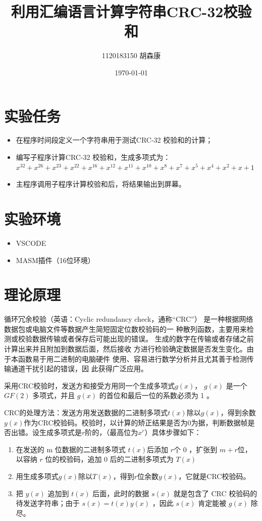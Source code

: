 \documentclass[UTF-8, a4paper, 12pt]{ctexart}
\title{\bfseries \Huge  利用汇编语言计算字符串CRC-32校验和}
\author{1120183150 胡森康}
\date{\today}
\begin{document}



\thispagestyle{empty}
\newpage
\thispagestyle{empty}

\maketitle
\tableofcontents
\newpage

\section{实验任务}
\begin{itemize}
    \item 在程序时间段定义一个字符串用于测试CRC-32 校验和的计算；
    \item 编写子程序计算CRC-32 校验和，生成多项式为：
    $x^{32}+x^{26}+x^{23}+x^{22}+x^{16}+x^{12}+x^{11}+x^{10}+x^{8}+x^{7}+x^{5}+x^{4}+x^{2}+x+1$
    \item 主程序调用子程序计算校验和后，将结果输出到屏幕。
\end{itemize}
\section{实验环境}
    \begin{itemize}
        \item VSCODE
        \item MASM插件（16位环境）
    \end{itemize}
\section{理论原理}
循环冗余校验（英语：Cyclic redundancy check，通称“CRC”）
是一种根据网络数据包或电脑文件等数据产生简短固定位数校验码的一
种散列函数，主要用来检测或校验数据传输或者保存后可能出现的错误。
生成的数字在传输或者存储之前计算出来并且附加到数据后面，然后接收
方进行检验确定数据是否发生变化。由于本函数易于用二进制的电脑硬件
使用、容易进行数学分析并且尤其善于检测传输通道干扰引起的错误，因
此获得广泛应用。

采用CRC校验时，发送方和接受方用同一个生成多项式$g(x)$， $g(x)$ 是一个 $GF(2)$ 多项式，并且 $g(x)$ 的首位和最后一位的系数必须为 1 。

CRC的处理方法：发送方用发送数据的二进制多项式$t(x)$除以$g(x)$，得到余数$y(x)$作为CRC校验码。校验时，以计算的矫正结果是否为0为据，判断数据帧是否出错。设生成多项式是$r$阶的，（最高位为$x^r$）具体步骤如下：
\begin{enumerate}
    \item 在发送的 m 位数据的二进制多项式 $t(x)$后添加 $r$个 0 ，扩张到 $m+r$位，以容纳 $r$ 位的校验码，追加 0 后的二进制多项式为  $T(x)$ 
    \item 用生成多项式$g(x)$除以$T(x)$，得到$r$位余数$y(x)$，它就是CRC校验码。
    \item 把 $y(x)$ 追加到 $t(x)$ 后面，此时的数据 $s(x)$ 就是包含了 CRC 校验码的待发送字符串；由于 $s(x) = t(x) y(x)$ ，因此 $s(x)$ 肯定能被 $g(x)$ 除尽。
    
\end{enumerate}
\end{document}

